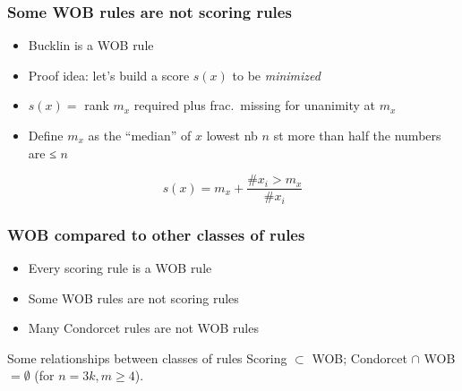 \documentclass[english]{beamer}
\begin{document}
\begin{frame}[fragile]
	\frametitle{Some WOB rules are not scoring rules}
	\begin{itemize}
		\item Bucklin is a WOB rule
		\item Proof idea: let’s build a score $s(x)$ to be \emph{minimized}
		\item $s(x) = $ rank $m_x$ required plus frac.\ missing for unanimity at $m_x$
		\item Define $m_x$ as the “median” of $x$ {\tiny lowest nb $n$ st more than half the numbers are ≤ $n$}
	\end{itemize}
	\begin{equation}
		s(x) = m_x + \frac{\# x_i > m_x}{\# x_i}
	\end{equation}
	\begin{example}
		\centering
	\end{example}
\end{frame}

\begin{frame}
	\frametitle{WOB compared to other classes of rules}
	\begin{itemize}
		\item Every scoring rule is a WOB rule
		\item Some WOB rules are not scoring rules
		\item Many Condorcet rules are not WOB rules
	\end{itemize}
	\begin{block}{Some relationships between classes of rules}
		Scoring $\subset$ WOB; Condorcet $\cap$ WOB $= \emptyset$ (for $n = 3k, m ≥ 4$).
	\end{block}
 \end{frame}
\end{document}
